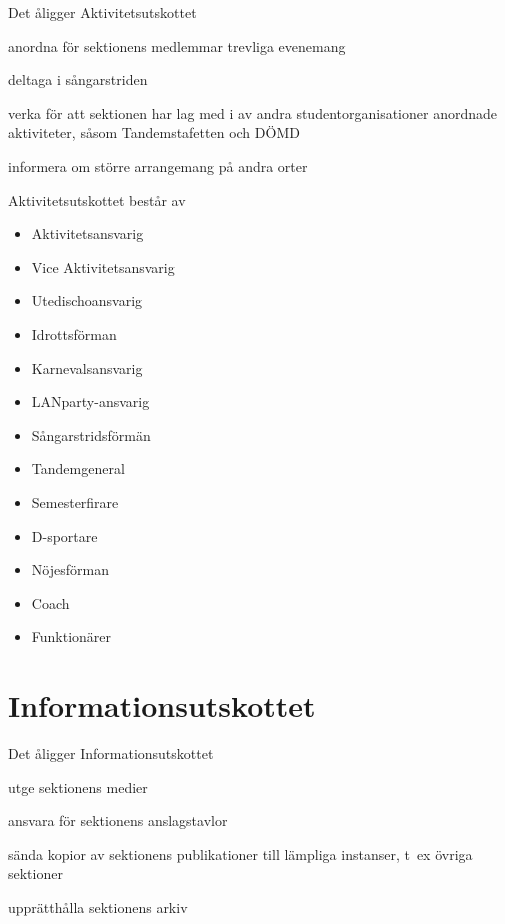 \documentclass[pdfbookmarks,a4paper,11pt]{article}
\newlength{\itemcollength}
\newenvironment{reglemlista}{%
  \begin{list}{}{%
      \setlength{\labelwidth}{\itemcollength}%
      \setlength{\leftmargin}{\labelwidth + \labelsep}%
      \renewcommand{\makelabel}[1]{%
        \raisebox{0pt}[1ex][0pt]{%
          \makebox[\labelwidth][l]{%
            \parbox[t]{\itemcollength}{%
              \raggedright\hspace{0pt}##1}}}\hfill}%
      }}{%
  \end{list}}
\begin{document}
\begin{reglemlista}

	\item[Åligganden]
	Det åligger Aktivitetsutskottet
	\begin{attlista}
		\item anordna för sektionens medlemmar trevliga evenemang
		\item deltaga i sångarstriden
		\item verka för att sektionen har lag med i av andra studentorganisationer anordnade aktiviteter, såsom Tandemstafetten och DÖMD
		\item informera om större arrangemang på andra orter
	\end{attlista}

	\item[Sammansättning]
	Aktivitetsutskottet består av
	\begin{itemize}
		\item Aktivitetsansvarig
		\item Vice Aktivitetsansvarig
		\item Utedischoansvarig
		\item Idrottsförman
		\item Karnevalsansvarig
		\item LANparty-ansvarig
		\item Sångarstridsförmän
		\item Tandemgeneral
		\item Semesterfirare
		\item D-sportare
		\item Nöjesförman
		\item Coach
		\item Funktionärer
	\end{itemize}


\section{Informationsutskottet}

\begin{reglemlista}

	\item[Åligganden]
	Det åligger Informationsutskottet
	\begin{attlista}
		\item utge sektionens medier
		\item ansvara för sektionens anslagstavlor
		\item sända kopior av sektionens publikationer till lämpliga instanser, t~ex övriga sektioner
		\item upprätthålla sektionens arkiv
	\end{attlista}


\end{reglemlista}
\end{reglemlista}
\end{document}

